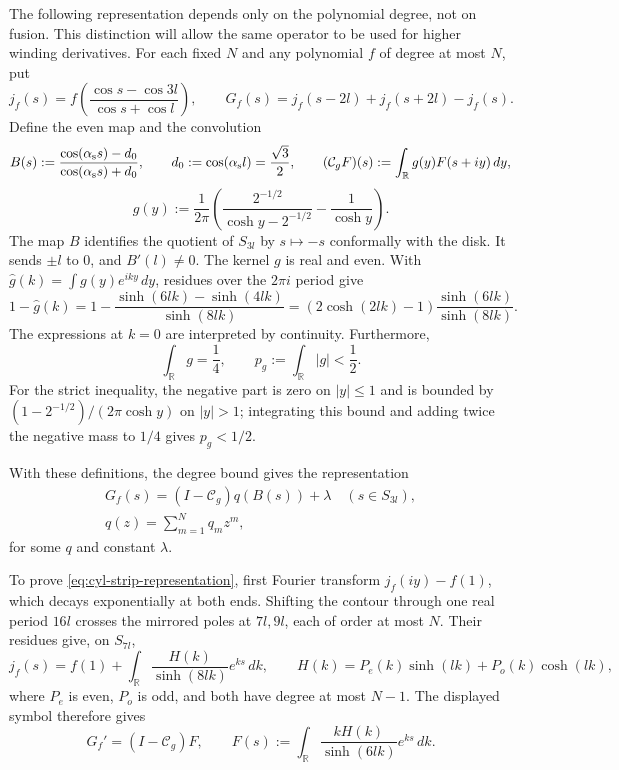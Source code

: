 The following representation depends only on the polynomial degree,
not on fusion.  This distinction will allow the same operator to be
used for higher winding derivatives.  For each fixed \(N\) and any
polynomial \(f\) of degree at most \(N\), put
\[
 j_f(s)=f\left(\frac{\cos s-\cos3l}{\cos s+\cos l}\right),
 \qquad
 G_f(s)=j_f(s-2l)+j_f(s+2l)-j_f(s).
\]
Define the even map and the convolution
\[
 B(s):=\frac{\cos(\alpha_{\rm s}s)-d_0}
             {\cos(\alpha_{\rm s}s)+d_0},
 \qquad d_0:=\cos(\alpha_{\rm s}l)=\frac{\sqrt3}{2},
 \qquad
 (\mathcal C_g F)(s):=\int_{\mathbb R}g(y)F(s+iy)\,dy,
\]
\[
 g(y):=\frac1{2\pi}
 \left(\frac{2^{-1/2}}{\cosh y-2^{-1/2}}-\frac1{\cosh y}\right).
\]
The map \(B\) identifies the quotient of \(S_{3l}\) by \(s\mapsto-s\)
conformally with the disk.  It sends \(\pm l\) to \(0\), and
\(B'(l)\ne0\).  The kernel \(g\) is real and even.  With
\(\widehat g(k)=\int g(y)e^{iky}\,dy\), residues over the \(2\pi i\)
period give
\[
 1-\widehat g(k)
 =1-\frac{\sinh(6lk)-\sinh(4lk)}{\sinh(8lk)}
 =(2\cosh(2lk)-1)\frac{\sinh(6lk)}{\sinh(8lk)}.
\]
The expressions at \(k=0\) are interpreted by continuity.
Furthermore,
\[
 \int_{\mathbb R}g=\frac14,\qquad p_g:=\int_{\mathbb R}|g|<\frac12.
\]
For the strict inequality, the negative part is zero on \(|y|\le1\)
and is bounded by
\((1-2^{-1/2})/(2\pi\cosh y)\) on \(|y|>1\); integrating this bound
and adding twice the negative mass to \(1/4\) gives \(p_g<1/2\).

With these definitions, the degree bound gives the representation
\begin{equation}\label{eq:cyl-strip-representation}
\begin{gathered}
 G_f(s)=(I-\mathcal C_g)q(B(s))+\lambda
 \quad(s\in S_{3l}),\\
 q(z)=\sum_{m=1}^N q_mz^m,
\end{gathered}
\end{equation}
for some \(q\) and constant \(\lambda\).

To prove \eqref{eq:cyl-strip-representation}, first Fourier transform
\(j_f(iy)-f(1)\), which decays exponentially at both ends.  Shifting
the contour through one real period \(16l\) crosses the mirrored poles
at \(7l,9l\), each of order at most \(N\).  Their residues give, on
\(S_{7l}\),
\[
 j_f(s)=f(1)+\int_{\mathbb R}
       \frac{H(k)}{\sinh(8lk)}e^{ks}\,dk,
 \qquad
 H(k)=P_e(k)\sinh(lk)+P_o(k)\cosh(lk),
\]
where \(P_e\) is even, \(P_o\) is odd, and both have degree at most
\(N-1\).  The displayed symbol therefore gives
\[
 G_f'=(I-\mathcal C_g)F,\qquad
 F(s):=\int_{\mathbb R}\frac{kH(k)}{\sinh(6lk)}e^{ks}\,dk.
\]

